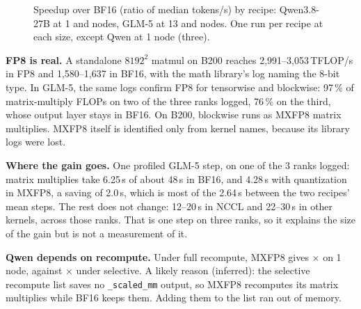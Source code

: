 \begin{figure}[h]
  \centering{}
  \caption{Speedup over BF16 (ratio of median tokens/s) by recipe: Qwen3.8-27B at 1 and \TriQwenFpTopNodes{} nodes, GLM-5 at 13 and \TriGlmFpTopNodes{} nodes. One run per recipe at each size, except Qwen at 1 node (three). }
  \label{fig:precision_speed}
\end{figure}

\textbf{FP8 is real.} A standalone $8192^2$ matmul on B200 reaches 2,991--3,053\,TFLOP/s in FP8 and 1,580--1,637 in BF16, with the math library's log naming the 8-bit type. In GLM-5, the same logs confirm FP8 for tensorwise and blockwise: 97\,\% of matrix-multiply FLOPs on two of the three ranks logged, 76\,\% on the third, whose output layer stays in BF16. On B200, blockwise runs as MXFP8 matrix multiplies. MXFP8 itself is identified only from kernel names, because its library logs were lost.

\textbf{Where the gain goes.} One profiled GLM-5 step, on one of the 3 ranks logged: matrix multiplies take 6.25\,s of about 48\,s in BF16, and 4.28\,s with quantization in MXFP8, a saving of 2.0\,s, which is most of the 2.64\,s between the two recipes' mean steps. The rest does not change: 12--20\,s in NCCL and 22--30\,s in other kernels, across those ranks. That is one step on three ranks, so it explains the size of the gain but is not a measurement of it.

\textbf{Qwen depends on recompute.} Under full recompute, MXFP8 gives $\times$\TriQwenFpFull{} on 1 node, against $\times$\TriQwenFpOne{} under selective. A likely reason (inferred): the selective recompute list saves no \texttt{\_scaled\_mm} output, so MXFP8 recomputes its matrix multiplies while BF16 keeps them. Adding them to the list ran out of memory.

